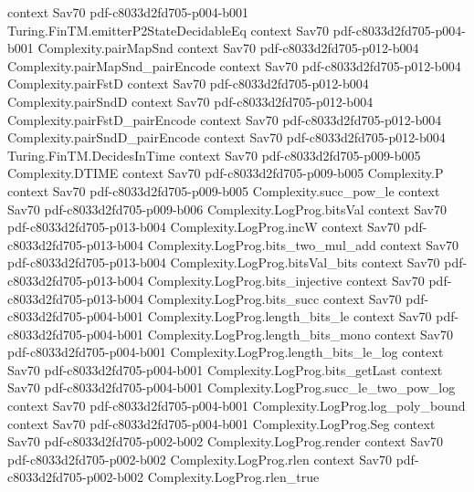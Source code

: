 \begin{theorem}
  {context}
  {Sav70}
  {pdf-c8033d2fd705-p004-b001}
\proofstep
  {Turing.FinTM.emitterP2StateDecidableEq}
  {context}
  {Sav70}
  {pdf-c8033d2fd705-p004-b001}
\proofstep
  {Complexity.pairMapSnd}
  {context}
  {Sav70}
  {pdf-c8033d2fd705-p012-b004}
\proofstep
  {Complexity.pairMapSnd_pairEncode}
  {context}
  {Sav70}
  {pdf-c8033d2fd705-p012-b004}
\proofstep
  {Complexity.pairFstD}
  {context}
  {Sav70}
  {pdf-c8033d2fd705-p012-b004}
\proofstep
  {Complexity.pairSndD}
  {context}
  {Sav70}
  {pdf-c8033d2fd705-p012-b004}
\proofstep
  {Complexity.pairFstD_pairEncode}
  {context}
  {Sav70}
  {pdf-c8033d2fd705-p012-b004}
\proofstep
  {Complexity.pairSndD_pairEncode}
  {context}
  {Sav70}
  {pdf-c8033d2fd705-p012-b004}
\proofstep
  {Turing.FinTM.DecidesInTime}
  {context}
  {Sav70}
  {pdf-c8033d2fd705-p009-b005}
\proofstep
  {Complexity.DTIME}
  {context}
  {Sav70}
  {pdf-c8033d2fd705-p009-b005}
\proofstep
  {Complexity.P}
  {context}
  {Sav70}
  {pdf-c8033d2fd705-p009-b005}
\proofstep
  {Complexity.succ_pow_le}
  {context}
  {Sav70}
  {pdf-c8033d2fd705-p009-b006}
\proofstep
  {Complexity.LogProg.bitsVal}
  {context}
  {Sav70}
  {pdf-c8033d2fd705-p013-b004}
\proofstep
  {Complexity.LogProg.incW}
  {context}
  {Sav70}
  {pdf-c8033d2fd705-p013-b004}
\proofstep
  {Complexity.LogProg.bits_two_mul_add}
  {context}
  {Sav70}
  {pdf-c8033d2fd705-p013-b004}
\proofstep
  {Complexity.LogProg.bitsVal_bits}
  {context}
  {Sav70}
  {pdf-c8033d2fd705-p013-b004}
\proofstep
  {Complexity.LogProg.bits_injective}
  {context}
  {Sav70}
  {pdf-c8033d2fd705-p013-b004}
\proofstep
  {Complexity.LogProg.bits_succ}
  {context}
  {Sav70}
  {pdf-c8033d2fd705-p004-b001}
\proofstep
  {Complexity.LogProg.length_bits_le}
  {context}
  {Sav70}
  {pdf-c8033d2fd705-p004-b001}
\proofstep
  {Complexity.LogProg.length_bits_mono}
  {context}
  {Sav70}
  {pdf-c8033d2fd705-p004-b001}
\proofstep
  {Complexity.LogProg.length_bits_le_log}
  {context}
  {Sav70}
  {pdf-c8033d2fd705-p004-b001}
\proofstep
  {Complexity.LogProg.bits_getLast}
  {context}
  {Sav70}
  {pdf-c8033d2fd705-p004-b001}
\proofstep
  {Complexity.LogProg.succ_le_two_pow_log}
  {context}
  {Sav70}
  {pdf-c8033d2fd705-p004-b001}
\proofstep
  {Complexity.LogProg.log_poly_bound}
  {context}
  {Sav70}
  {pdf-c8033d2fd705-p004-b001}
\proofstep
  {Complexity.LogProg.Seg}
  {context}
  {Sav70}
  {pdf-c8033d2fd705-p002-b002}
\proofstep
  {Complexity.LogProg.render}
  {context}
  {Sav70}
  {pdf-c8033d2fd705-p002-b002}
\proofstep
  {Complexity.LogProg.rlen}
  {context}
  {Sav70}
  {pdf-c8033d2fd705-p002-b002}
\proofstep
  {Complexity.LogProg.rlen_true}

\end{theorem}
